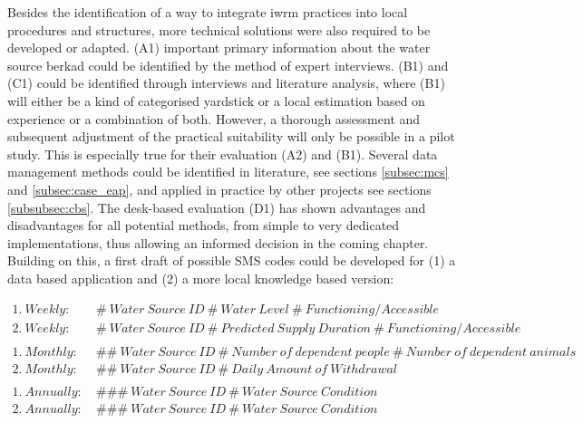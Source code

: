 Besides the identification of a way to integrate \acrshort{iwrm} practices into local procedures and structures, more technical solutions were also required to be developed or adapted. (A1) important primary information about the water source berkad could be identified by the method of expert interviews. (B1) and (C1) could be identified through interviews and literature analysis, where (B1) will either be a kind of categorised yardstick or a local estimation based on experience or a combination of both. However, a thorough assessment and subsequent adjustment of the practical suitability will only be possible in a pilot study. This is especially true for their evaluation (A2) and (B1). Several data management methods could be identified in literature, see sections \ref{subsec:mcs} and \ref{subsec:case_eap}, and applied in practice by other projects see sections \ref{subsubsec:cbs}. The desk-based evaluation (D1) has shown advantages and disadvantages for all potential methods, from simple to very dedicated implementations, thus allowing an informed decision in the coming chapter. Building on this, a first draft of possible SMS codes could be developed for (1) a data based application and (2) a more local knowledge based version:

\begin{center}
    \begin{minipage}{0.9\textwidth}
        \begin{align*}
            1.\: Weekly:\ &\#\: Water\: Source\: ID\: \#\: Water\: Level\: \#\: Functioning/Accessible\\
            2.\: Weekly:\ &\#\: Water\: Source\: ID\: \#\: Predicted\: Supply\: Duration\: \#\: Functioning/Accessible\\
            \\
            1.\: Monthly:\ &\#\#\: Water\: Source\: ID\: \#\: Number\: of\: dependent\: people\: \#\: Number\: of\: dependent\: animals\\
            2.\: Monthly:\ &\#\#\: Water\: Source\: ID\: \#\: Daily\: Amount\: of\: Withdrawal\\
            \\
            1.\: Annually:\ &\#\#\#\: Water\: Source\: ID\: \#\: Water\: Source\: Condition\\
            2.\: Annually:\ &\#\#\#\: Water\: Source\: ID\: \#\: Water\: Source\: Condition\\
        \end{align*}
    \end{minipage}
\end{center}


